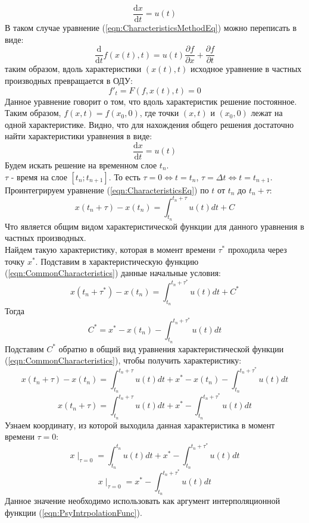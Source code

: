 \documentclass[10pt,a4paper]{article}
\begin{document}
\[
\frac{\text{d}x}{\text{d}t}=u(t)
\]
В таком случае уравнение (\ref{eqn:CharacteristicsMethodEq}) можно переписать в виде:
\[
\frac{\text{d}}{\text{d}t}f(x(t),t)=u(t)\frac{\partial f}{\partial x}+\frac{\partial f}{\partial t}
\]
таким образом, вдоль характеристики $(x(t),t)$ исходное уравнение в частных производных превращается в ОДУ:
\[
f'_t=F(f,x(t),t)=0
\]
Данное уравнение говорит о том, что вдоль характеристик решение постоянное. Таким образом, $f(x,t)=f(x_0,0)$, где точки $(x,t)$ и $(x_0,0)$ лежат на одной характеристике. Видно, что для нахождения общего решения достаточно найти характеристики уравнения в виде:
\begin{equation}
\label{eqn:CharacteristicsEq}
\frac{\text{d}x}{\text{d}t}=u(t)
\end{equation}
Будем искать решение на временном слое $t_n$.
\\$\tau$ - время на слое $[t_n; t_{n+1}]$. То есть $\tau=0 \Leftrightarrow t=t_n$, $\tau=\Delta t \Leftrightarrow t=t_{n+1}$.
\\Проинтегрируем уравнение (\ref{eqn:CharacteristicsEq}) по $t$ от $t_n$ до $t_n+\tau$:
\begin{equation}
\label{eqn:CommonCharacteristics}
x(t_n+\tau)-x(t_n)=\int_{t_n}^{t_n+\tau}u(t)dt + C
\end{equation}
Что является общим видом характеристической функции для данного уравнения в частных производных.
\\Найдем такую характеристику, которая в момент времени $\tau^*$ проходила через точку $x^*$. Подставим в характеристическую функцию (\ref{eqn:CommonCharacteristics}) данные начальные условия:
\[
x(t_n+\tau^*)-x(t_n)=\int_{t_n}^{t_n+\tau^*}u(t)dt + C^*
\]
Тогда
\[
C^* = x^*-x(t_n)-\int_{t_n}^{t_n+\tau^*}u(t)dt
\]
Подставим $C^*$ обратно в общий вид уравнения характеристической функции (\ref{eqn:CommonCharacteristics}), чтобы получить характеристику:
\[
x(t_n+\tau)-x(t_n)=\int_{t_n}^{t_n+\tau}u(t)dt + x^*-x(t_n)-\int_{t_n}^{t_n+\tau^*}u(t)dt
\]
\begin{equation}
\label{eqn:Characteristic}
x(t_n+\tau)=\int_{t_n}^{t_n+\tau}u(t)dt + x^*-\int_{t_n}^{t_n+\tau^*}u(t)dt
\end{equation}
Узнаем координату, из которой выходила данная характеристика в момент времени $\tau=0$:
\[
x\mid_{\tau=0}=\int_{t_n}^{t_n}u(t)dt + x^*-\int_{t_n}^{t_n+\tau^*}u(t)dt
\]
\begin{equation}
\label{eqn:CharacteristicFromZero}
x\mid_{\tau=0}=x^*-\int_{t_n}^{t_n+\tau^*}u(t)dt
\end{equation}
Данное значение необходимо использовать как аргумент интерполяционной функции (\ref{eqn:PsyIntrpolationFunc}).
\end{document}
